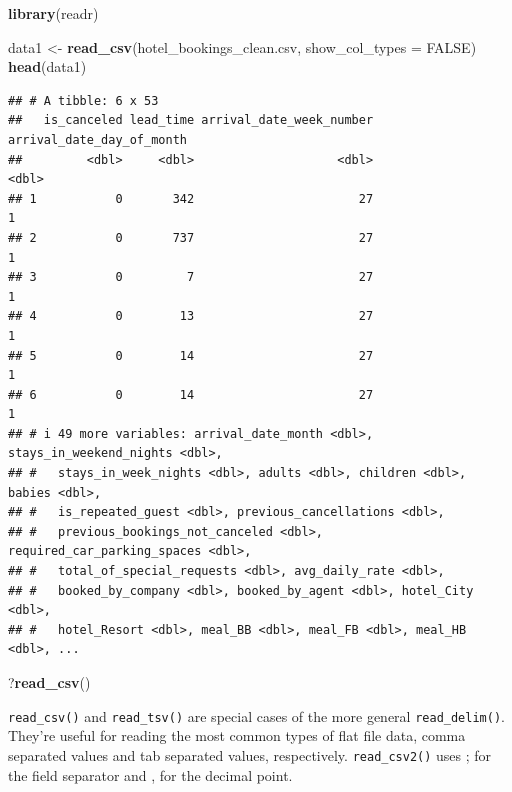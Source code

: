 \documentclass[
]{article}
\newenvironment{Shaded}{\begin{snugshade}}{\end{snugshade}}
\newcommand{\AttributeTok}[1]{\textcolor[rgb]{0.13,0.29,0.53}{#1}}
\newcommand{\ConstantTok}[1]{\textcolor[rgb]{0.56,0.35,0.01}{#1}}
\newcommand{\FunctionTok}[1]{\textcolor[rgb]{0.13,0.29,0.53}{\textbf{#1}}}
\newcommand{\NormalTok}[1]{#1}
\newcommand{\OtherTok}[1]{\textcolor[rgb]{0.56,0.35,0.01}{#1}}
\newcommand{\StringTok}[1]{\textcolor[rgb]{0.31,0.60,0.02}{#1}}
\begin{document}
\begin{Shaded}
\begin{Highlighting}[]
\FunctionTok{library}\NormalTok{(readr)}

\NormalTok{data1 }\OtherTok{\textless{}{-}} \FunctionTok{read\_csv}\NormalTok{(}\StringTok{\textquotesingle{}hotel\_bookings\_clean.csv\textquotesingle{}}\NormalTok{, }\AttributeTok{show\_col\_types =} \ConstantTok{FALSE}\NormalTok{)}
\FunctionTok{head}\NormalTok{(data1)}
\end{Highlighting}
\end{Shaded}

\begin{verbatim}
## # A tibble: 6 x 53
##   is_canceled lead_time arrival_date_week_number arrival_date_day_of_month
##         <dbl>     <dbl>                    <dbl>                     <dbl>
## 1           0       342                       27                         1
## 2           0       737                       27                         1
## 3           0         7                       27                         1
## 4           0        13                       27                         1
## 5           0        14                       27                         1
## 6           0        14                       27                         1
## # i 49 more variables: arrival_date_month <dbl>, stays_in_weekend_nights <dbl>,
## #   stays_in_week_nights <dbl>, adults <dbl>, children <dbl>, babies <dbl>,
## #   is_repeated_guest <dbl>, previous_cancellations <dbl>,
## #   previous_bookings_not_canceled <dbl>, required_car_parking_spaces <dbl>,
## #   total_of_special_requests <dbl>, avg_daily_rate <dbl>,
## #   booked_by_company <dbl>, booked_by_agent <dbl>, hotel_City <dbl>,
## #   hotel_Resort <dbl>, meal_BB <dbl>, meal_FB <dbl>, meal_HB <dbl>, ...
\end{verbatim}

\begin{Shaded}
\begin{Highlighting}[]
\NormalTok{?}\FunctionTok{read\_csv}\NormalTok{()}
\end{Highlighting}
\end{Shaded}

\texttt{read\_csv()} and \texttt{read\_tsv()} are special cases of the
more general \texttt{read\_delim()}. They're useful for reading the most
common types of flat file data, comma separated values and tab separated
values, respectively. \texttt{read\_csv2()} uses ⁠;⁠ for the field
separator and ⁠,⁠ for the decimal point.
\end{document}
